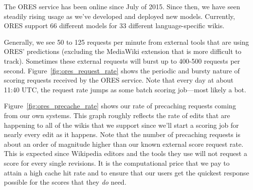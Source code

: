 The ORES service has been online since July of 2015\cite{halfaker2015artificial}.  Since then, we have seen steadily rising usage as we've developed and deployed new models.  Currently, ORES support 66 different models for 33 different language-specific wikis.

Generally, we see 50 to 125 requests per minute from external tools that are using ORES' predictions (excluding the MediaWiki extension that is more difficult to track).  Sometimes these external requests will burst up to 400-500 requests per second.  Figure~\ref{fig:ores_request_rate} shows the periodic and bursty nature of scoring requests received by the ORES service.  Note that every day at about 11:40 UTC, the request rate jumps as some batch scoring job---most likely a bot.

Figure~\ref{fig:ores_precache_rate} shows our rate of precaching requests coming from our own systems.  This graph roughly reflects the rate of edits that are happening to all of the wikis that we support since we'll start a scoring job for nearly every edit as it happens.  Note that the number of precaching requests is about an order of magnitude higher than our known external score request rate.  This is expected since Wikipedia editors and the tools they use will not request a score for every single revisions.  It is the computational price that we pay to attain a high cache hit rate and to ensure that our users get the quickest response possible for the scores that they \emph{do} need.
